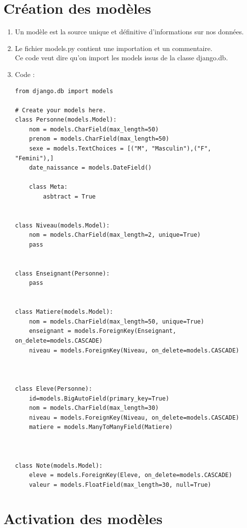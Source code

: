 \documentclass[10pt,a4paper]{article}
\begin{document}
\section{Création des modèles}
\begin{enumerate}
\item[] Un modèle est la source unique et définitive d’informations sur nos données.

\item Le fichier models.py contient une importation et un commentaire.\\
Ce code veut dire qu'on import les models issus de la classe django.db.


\item Code : 
\begin{verbatim}
from django.db import models

# Create your models here.
class Personne(models.Model):
    nom = models.CharField(max_length=50)
    prenom = models.CharField(max_length=50)
    sexe = models.TextChoices = [("M", "Masculin"),("F", "Femini"),]
    date_naissance = models.DateField()

    class Meta:
        asbtract = True


class Niveau(models.Model):
    nom = models.CharField(max_length=2, unique=True)
    pass


class Enseignant(Personne):
    pass


class Matiere(models.Model):
    nom = models.CharField(max_length=50, unique=True)
    enseignant = models.ForeignKey(Enseignant, on_delete=models.CASCADE)
    niveau = models.ForeignKey(Niveau, on_delete=models.CASCADE)
    


class Eleve(Personne):
    id=models.BigAutoField(primary_key=True)
    nom = models.CharField(max_length=30)
    niveau = models.ForeignKey(Niveau, on_delete=models.CASCADE)
    matiere = models.ManyToManyField(Matiere)



class Note(models.Model):
    eleve = models.ForeignKey(Eleve, on_delete=models.CASCADE)
    valeur = models.FloatField(max_length=30, null=True)
\end{verbatim}
\end{enumerate}

\section{Activation des modèles}
\end{document}
